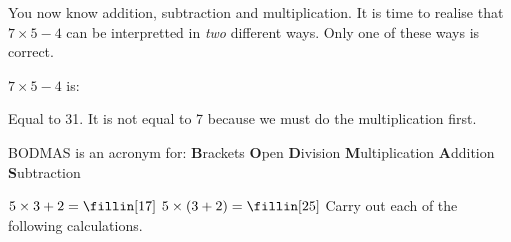 You now know addition, subtraction and multiplication. It is time to realise that $7\times 5 - 4$ can be interpretted in \emph{two} different ways. Only one of these ways is correct.

$7\times 5-4$ is:
\begin{solutionordottedlines}[1in]
    Equal to 31. It is not equal to 7 because we must do the multiplication first.
\end{solutionordottedlines}

\bigskip
{}
\bigskip
\begin{instructor}
    BODMAS is an acronym for: \textbf{B}rackets \textbf{O}pen \textbf{D}ivision \textbf{M}ultiplication \textbf{A}ddition \textbf{S}ubtraction
\end{instructor}

\begin{examples}
    \begin{questions}
        \Question[1] $5 \times 3+2 =\fillin[17]$
        \Question[1] $5\times (3+2) = \fillin[25]$
        \Question Carry out each of the following calculations.
        \begin{parts}\end{parts}
    \end{questions}
\end{examples}

